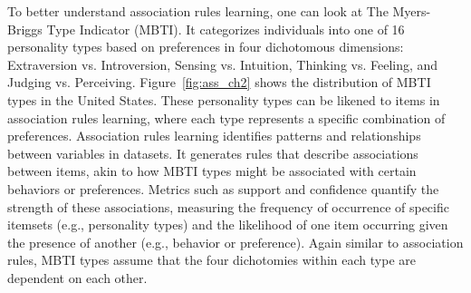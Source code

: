
To better understand association rules learning, one can look at The Myers-Briggs Type Indicator (MBTI). It categorizes individuals into one of 16 personality types based on preferences in four dichotomous dimensions: Extraversion vs. Introversion, Sensing vs. Intuition, Thinking vs. Feeling, and Judging vs. Perceiving. Figure~\ref{fig:ass_ch2} shows the distribution of MBTI types in the United States. These personality types can be likened to items in association rules learning, where each type represents a specific combination of preferences. Association rules learning identifies patterns and relationships between variables in datasets. It generates rules that describe associations between items, akin to how MBTI types might be associated with certain behaviors or preferences. Metrics such as support and confidence quantify the strength of these associations, measuring the frequency of occurrence of specific itemsets (e.g., personality types) and the likelihood of one item occurring given the presence of another (e.g., behavior or preference). Again similar to association rules, MBTI types assume that the four dichotomies within each type are dependent on each other.\textcolor{white}{\citep{varona_comparing_2011}} %






